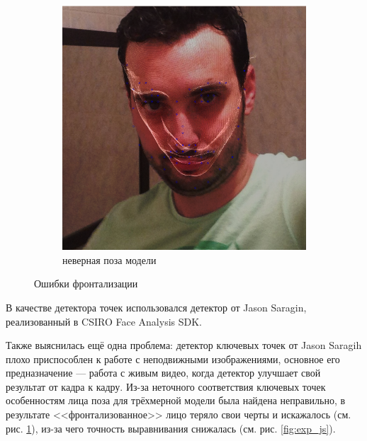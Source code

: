 \begin{figure}[t]
\begin{subfigure}[t]{0.3\textwidth}
		\includegraphics[width=\textwidth]{bad_model_fitting.png}
		\caption{неверная поза модели}
	\end{subfigure}
	\caption{Ошибки фронтализации}
	\label{fig:exp_err}
\end{figure}

В качестве детектора точек использовался детектор от Jason Saragin, реализованный в CSIRO Face Analysis SDK.

Также выяснилась ещё одна проблема: детектор ключевых точек от Jason Saragih плохо приспособлен к работе с неподвижными изображениями, основное его предназначение --- работа с живым видео, когда детектор улучшает свой результат от кадра к кадру. Из-за неточного соответствия ключевых точек особенностям лица поза для трёхмерной модели была найдена неправильно, в результате <<фронтализованное>> лицо теряло свои черты и искажалось (см. рис. \ref{fig:exp_err}), из-за чего точность выравнивания снижалась (см. рис. \ref{fig:exp_js}).

